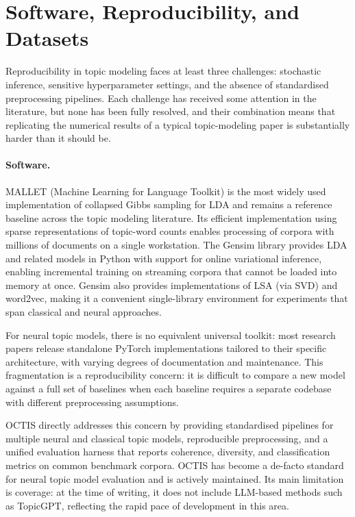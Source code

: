 \documentclass[11pt,a4paper]{article}
\begin{document}
\section{Software, Reproducibility, and Datasets}
\label{sec:software}

Reproducibility in topic modeling faces at least three challenges:
stochastic inference, sensitive hyperparameter settings, and the
absence of standardised preprocessing pipelines.
Each challenge has received some attention in the literature, but none
has been fully resolved, and their combination means that replicating
the numerical results of a typical topic-modeling paper is
substantially harder than it should be.

\paragraph{Software.}
MALLET (Machine Learning for Language Toolkit) is the most widely
used implementation of collapsed Gibbs sampling for LDA and remains a
reference baseline across the topic modeling literature.
Its efficient implementation using sparse representations of
topic-word counts enables processing of corpora with millions of
documents on a single workstation.
The Gensim library provides LDA and related models in Python with
support for online variational inference, enabling incremental training
on streaming corpora that cannot be loaded into memory at once.
Gensim also provides implementations of LSA (via SVD) and word2vec,
making it a convenient single-library environment for experiments that
span classical and neural approaches.

For neural topic models, there is no equivalent universal toolkit:
most research papers release standalone PyTorch implementations
tailored to their specific architecture, with varying degrees of
documentation and maintenance.
This fragmentation is a reproducibility concern: it is difficult to
compare a new model against a full set of baselines when each baseline
requires a separate codebase with different preprocessing assumptions.

OCTIS \parencite{terragni2021octis} directly addresses this concern by
providing standardised pipelines for multiple neural and classical
topic models, reproducible preprocessing, and a unified evaluation
harness that reports coherence, diversity, and classification metrics
on common benchmark corpora.
OCTIS has become a de-facto standard for neural topic model evaluation
and is actively maintained.
Its main limitation is coverage: at the time of writing, it does not
include LLM-based methods such as TopicGPT, reflecting the rapid pace
of development in this area.
\end{document}
